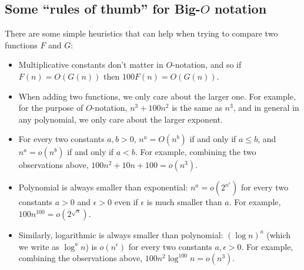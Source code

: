 \subsection{Some ``rules of thumb'' for Big-\(O\)
notation}\label{Some-rules-of-thumb-for-B}

There are some simple heuristics that can help when trying to compare
two functions \(F\) and \(G\):

\begin{itemize}
\item
  Multiplicative constants don't matter in \(O\)-notation, and so if
  \(F(n)=O(G(n))\) then \(100F(n)=O(G(n))\).
\item
  When adding two functions, we only care about the larger one. For
  example, for the purpose of \(O\)-notation, \(n^3+100n^2\) is the same
  as \(n^3\), and in general in any polynomial, we only care about the
  larger exponent.
\item
  For every two constants \(a,b>0\), \(n^a = O(n^b)\) if and only if
  \(a \leq b\), and \(n^a = o(n^b)\) if and only if \(a<b\). For
  example, combining the two observations above,
  \(100n^2 + 10n + 100 = o(n^3)\).
\item
  Polynomial is always smaller than exponential:
  \(n^a = o(2^{n^\epsilon})\) for every two constants \(a>0\) and
  \(\epsilon>0\) even if \(\epsilon\) is much smaller than \(a\). For
  example, \(100n^{100} = o(2^{\sqrt{n}})\).
\item
  Similarly, logarithmic is always smaller than polynomial:
  \((\log n)^a\) (which we write as \(\log^a n\)) is \(o(n^\epsilon)\)
  for every two constants \(a,\epsilon>0\). For example, combining the
  observations above, \(100n^2 \log^{100} n = o(n^3)\).
\end{itemize}

\hypertarget{bigonotime}{}

